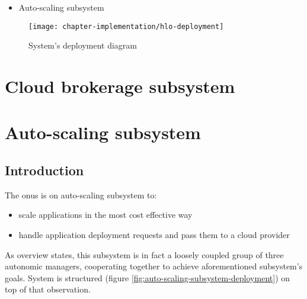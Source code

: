 \begin{itemize}

  \item Auto-scaling subsystem
\end{itemize}

\newpage
\begin{figure}[!ht]
  \begin{center}
    \texttt{[image: chapter-implementation/hlo-deployment]}
  \end{center}
  \caption{System's deployment diagram}
  \label{fig:hlo-deployment}
\end{figure}

\section{Cloud brokerage subsystem}


\section{Auto-scaling subsystem}

\subsection{Introduction}
The onus is on auto-scaling subsystem to:
\begin{itemize}
 \item scale applications in the most cost effective way
 \item handle application deployment requests and pass them to a cloud provider 
\end{itemize}

As overview states, this subsystem is in fact a loosely coupled group of three autonomic managers, cooperating together to achieve aforementioned subsystem's goals. System is structured (figure \ref{fig:auto-scaling-subsystem-deployment}) on top of that observation.

